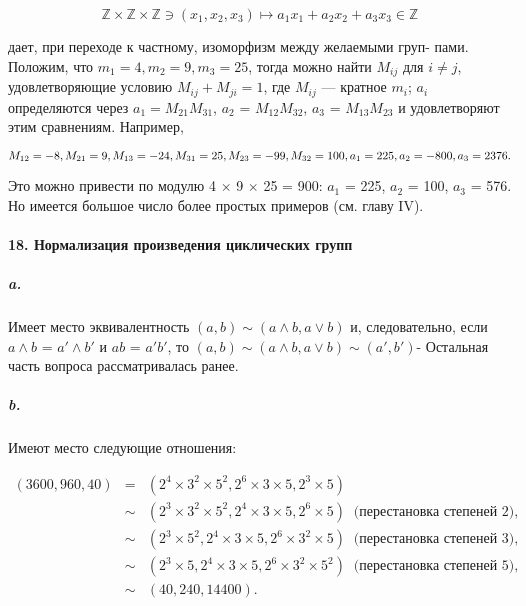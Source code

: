 \documentclass{mai_book}
\begin{document}
{\begin{equation*}
\mathbb{Z} \times \mathbb{Z} \times \mathbb{Z} \ni (x_{1},x_{2},x_{3}) \mapsto a_{1}x_{1} + a_{2}x_{2} + a_{3}x_{3} \in \mathbb {Z}
\end{equation*}




\noindent дает, при переходе к частному, изоморфизм между желаемыми груп-
пами. Положим, что $m_1 = 4, m_2 = 9, m_3 = 25$, тогда можно найти $M_{ij}$
для $i \neq j$, удовлетворяющие условию $M_{ij} + M_{ji} = 1$, где $M_{ij}$ — кратное
$m_{i}$; $a_i$ определяются через $a_1 = M_{21}M_{31}$, $a_2$ = $M_{12}M_{32}$, $a_3$ = $M_{13}M_{23}$ и
удовлетворяют этим сравнениям. Например,

\begin{equation*}
M_{12} = -8, M_{21} = 9, M_{13} = -24, M_{31} = 25, M_{23} = -99, M_{32} = 100, \\
a_1 = 225, a_2 = -800, a_3 = 2376.
\end{equation*}

\noindent Это можно привести по модулю 4 $\times$ 9 $\times$ 25 = 900: $a_1$ = 225, $a_2$ = 100,
$a_3$ = 576. Но имеется большое число более простых примеров (см. главу IV).

\paragraph{18. Нормализация произведения циклических групп}

\subparagraph{a.} Имеет место эквивалентность $(a,b) \sim (a \wedge b, a \vee b)$ и, следовательно,
если $a \wedge b$ = $a' \wedge b'$ и $ab$ = $a'b'$, то $(a,b) \sim (a \wedge b, a \vee b) \sim (a',b')$- Остальная
часть вопроса рассматривалась ранее.

\subparagraph{b.} Имеют место следующие отношения:

\begin{eqnarray*}
(3600,960,40) &=&(2^4 \times 3^2 \times 5^2, 2^6 \times 3 \times 5, 2^3 \times 5)\\
              &\sim&(2^3 \times 3^2 \times 5^2, 2^4 \times 3 \times 5, 2^6 \times 5)\;\;\text{(перестановка степеней 2),}\\
              &\sim&(2^3 \times 5^2, 2^4 \times 3 \times 5, 2^6 \times 3^2 \times 5)\;\;\text{(перестановка степеней 3),}\\
              &\sim&(2^3 \times 5, 2^4 \times 3 \times 5, 2^6 \times 3^2 \times 5^2)\;\;\text{(перестановка степеней 5),}\\
              &\sim&(40,240,14400).
\end{eqnarray*}

}
\end{document}
